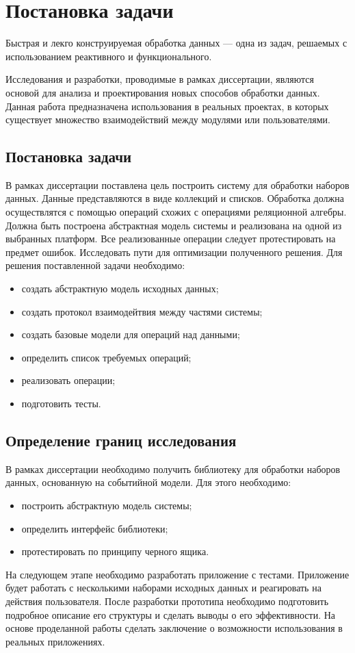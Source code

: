 \chapter{Постановка задачи}
\label{sec:practice:planning}

Быстрая и лекго конструируемая обработка данных --- одна из задач, решаемых с использованием реактивного и функционального.

Исследования и разработки, проводимые в рамках диссертации, являются основой для анализа и проектирования новых способов обработки данных.
Данная работа предназначена использования в реальных проектах, в которых существует множество взаимодействий между модулями или пользователями.

\section{Постановка задачи}
\label{sub:practice:task_planning}

В рамках диссертации поставлена цель построить систему для обработки наборов данных.
Данные представляются в виде коллекций и списков.
Обработка должна осуществлятся с помощью операций схожих с операциями реляционной алгебры.
Должна быть построена абстрактная модель системы и реализована на одной из выбранных платформ.
Все реализованные операции следует протестировать на предмет ошибок.
Исследовать пути для оптимизации полученного решения.
Для решения поставленной задачи необходимо:
\begin{itemize}
  \item создать абстрактную модель исходных данных;
  \item создать протокол взаимодейтвия между частями системы;
  \item создать базовые модели для операций над данными;
  \item	определить список требуемых операций;
  \item	реализовать операции;
  \item	подготовить тесты.
\end{itemize}

\section{Определение границ исследования}
\label{sub:practice:task_milestone}

В рамках диссертации необходимо получить библиотеку для обработки наборов данных, основанную на событийной модели.
Для этого необходимо:
\begin{itemize}
  \item построить абстрактную модель системы;
  \item определить интерфейс библиотеки;
  \item протестировать по принципу черного ящика.
\end{itemize}

На следующем этапе необходимо разработать приложение с тестами.
Приложение будет работать с несколькими наборами исходных данных и реагировать на действия пользователя.
После разработки прототипа необходимо подготовить подробное описание его структуры и сделать выводы о его эффективности.
На основе проделанной работы сделать заключение о возможности использования в реальных приложениях.
